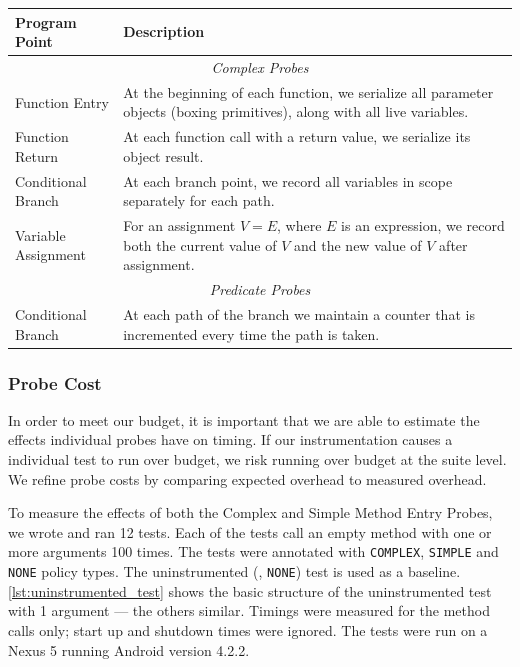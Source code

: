 {\begin{center}
    \begin{tabular}{| l | p{6cm} |}
    \hline
        \textbf{Program Point} & \textbf{Description} \\
    \hline
        \multicolumn{2}{|c|}{\textit{Complex Probes}} \\
    \hline
        Function Entry &
        At the beginning of each function, we serialize all parameter objects
        (boxing primitives), along with all live variables. \\
    \hline
        Function Return &
        At each function call with a return value, we serialize its object
        result. \\
    \hline
        Conditional Branch &
        At each branch point, we record all variables in scope separately for
        each path. \\
    \hline
        Variable Assignment &
        For an assignment $V = E$, where $E$ is an expression, we record both
        the current value of $V$ and the new value of $V$ after assignment. \\
    \hline
        \multicolumn{2}{|c|}{\textit{Predicate Probes}} \\
    \hline
        Conditional Branch &
        At each path of the branch we maintain a counter that is incremented
        every time the path is taken. \\
    \hline

    \end{tabular}
\end{center}

\subsubsection{Probe Cost}
\label{sec:sec:probe_cost}

In order to meet our budget, it is important that we are able to estimate the
effects individual probes have on timing. If our instrumentation causes a
individual test to run over budget, we risk running over budget at the suite
level. We refine probe costs by comparing expected overhead to measured
overhead.

To measure the effects of both the Complex and Simple Method Entry Probes, we
wrote and ran 12 tests. Each of the tests call an empty method with one or more
arguments 100 times. The tests were annotated with {\tt COMPLEX}, {\tt SIMPLE}
and {\tt NONE} policy types. The uninstrumented (\ie, {\tt NONE}) test is used
as a baseline. \autoref{lst:uninstrumented_test} shows the basic structure of
the uninstrumented test with 1 argument --- the others similar. Timings were
measured for the method calls only; start up and shutdown times were ignored.
The tests were run on a Nexus 5 running Android version 4.2.2.

}
